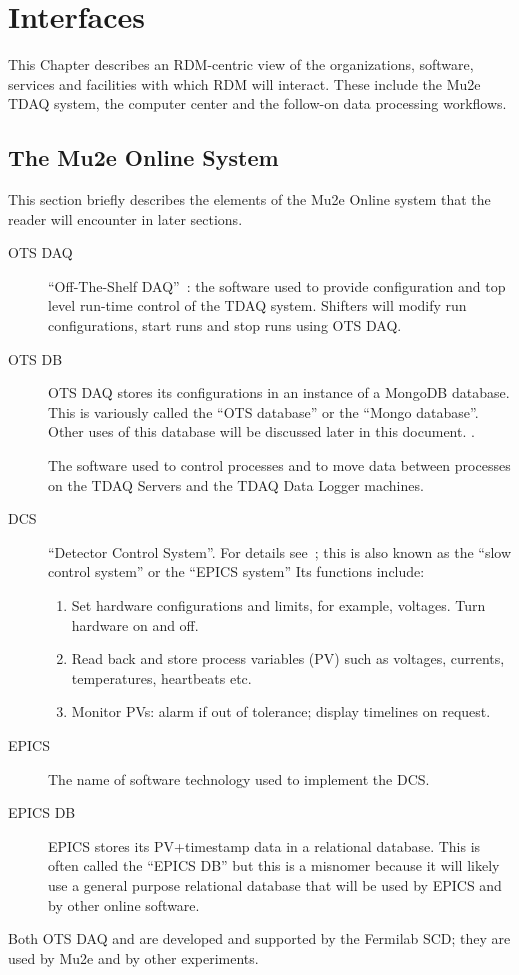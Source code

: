 \chapter{Interfaces}
\label{ch:SelectedDetails}

This Chapter describes an RDM-centric view of the organizations, software, services and facilities
with which RDM will interact.  These include the Mu2e TDAQ system,
the computer center and the follow-on data processing workflows.

\section{The Mu2e Online System}
\label{sec:Mu2eOnlineSystem}

This section briefly describes the elements of the Mu2e Online system that the reader will encounter in later sections.

\begin{description}
\item[OTS DAQ] ``Off-The-Shelf DAQ''~\cite{MU2EOTSDAQ}: the software used to provide configuration and top level run-time control of the TDAQ system.
  Shifters will modify run configurations, start runs and stop runs using OTS DAQ.
\item[OTS DB] OTS DAQ stores its configurations in an instance of a MongoDB database.  This is variously called the ``OTS database'' or the ``Mongo database''.
  Other uses of this database will be discussed later in this document. .
\item[\artdaq] The software used to control processes and to move data between processes on the TDAQ Servers and the TDAQ Data Logger machines.
\item[DCS] ``Detector Control System''.
  For details see~\cite{DCSSpec};
  this is also known as the ``slow control system'' or the ``EPICS system''
  Its functions include:
  \begin{enumerate}
    \item Set hardware configurations and limits, for example, voltages.  Turn hardware on and off.
    \item Read back and store process variables (PV) such as voltages, currents, temperatures, heartbeats etc.
    \item Monitor PVs: alarm if out of tolerance; display timelines on request.
  \end{enumerate}
\item[EPICS] The name of software technology used to implement the DCS.
\item[EPICS DB] EPICS stores its PV+timestamp data in a relational database.
  This is often called the ``EPICS DB'' but this is a misnomer because it will likely use
  a general purpose relational database that will be used by EPICS
  and by other online software.
\end{description}
Both OTS DAQ and \artdaq are developed and supported by the Fermilab SCD;
they are used by Mu2e and by other experiments.


